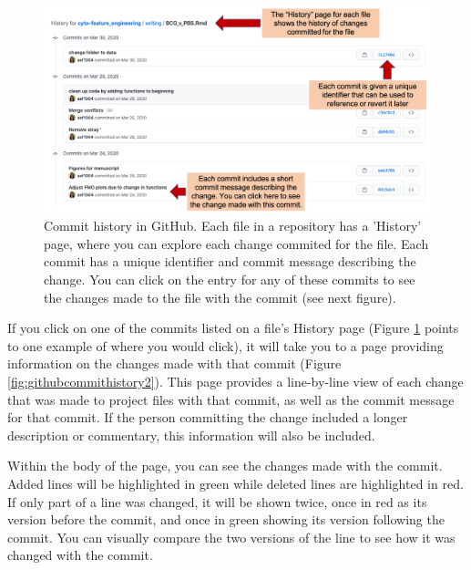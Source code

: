 \documentclass[]{tufte-book}
\begin{document}
\begin{figure}
\includegraphics[width=\textwidth]{figures/github_commit_history} \caption[Commit history in GitHub]{Commit history in GitHub. Each file in a repository has a 'History' page, where you can explore each change commited for the file. Each commit has a unique identifier and commit message describing the change. You can click on the entry for any of these commits to see the changes made to the file with the commit (see next figure).}\label{fig:githubcommithistory}
\end{figure}

If you click on one of the commits listed on a file's History page (Figure
\ref{fig:githubcommithistory} points to one example of where you would click),
it will take you to a page providing information on the changes made with that
commit (Figure \ref{fig:githubcommithistory2}). This page provides a
line-by-line view of each change that was made to project files with that
commit, as well as the commit message for that commit. If the person
committing the change included a longer description or commentary,
this information will also be included.

Within the body of the page, you can see the changes made with the commit. Added
lines will be highlighted in green while deleted lines are highlighted in red.
If only part of a line was changed, it will be shown twice, once in red as its
version before the commit, and once in green showing its version following the
commit. You can visually compare the two versions of the line to see how it was
changed with the commit.
\end{document}
